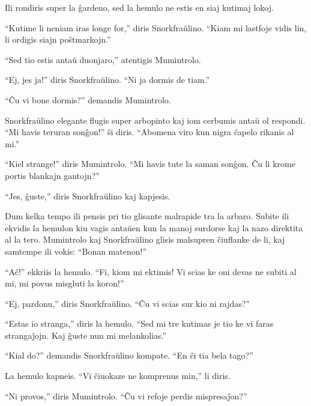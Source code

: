 Ili rondiris super la ĝardeno, sed la hemulo ne estis en siaj kutimaj lokoj.

``Kutime li neniam iras longe for,'' diris Snorkfraŭlino. ``Kiam mi lastfoje vidis lin, li ordigis siajn poŝtmarkojn.''

``Sed tio estis antaŭ duonjaro,'' atentigis Mumintrolo.

``Ej, jes ja!'' diris Snorkfraŭlino. ``Ni ja dormis de tiam.''

``Ĉu vi bone dormis?'' demandis Mumintrolo.

Snorkfraŭlino elegante flugis super arbopinto kaj iom cerbumis antaŭ ol respondi. ``Mi havis teruran sonĝon!'' ŝi diris. ``Abomena viro kun nigra ĉapelo rikanis al mi.''

``Kiel strange!'' diris Mumintrolo. ``Mi havis tute la saman sonĝon. Ĉu li krome portis blankajn gantojn?''

``Jes, ĝuste,'' diris Snorkfraŭlino kaj kapjesis.

Dum kelka tempo ili pensis pri tio glisante malrapide tra la arbaro. Subite ili ekvidis la hemulon kiu vagis antaŭen kun la manoj surdorse kaj la nazo direktita al la tero. Mumintrolo kaj Snorkfraŭlino glisis malsupren ĉiuflanke de li, kaj samtempe ili vokis: ``Bonan matenon!''

``Aĉ!'' ekkriis la hemulo. ``Fi, kiom mi ektimis! Vi scias ke oni devas ne subiti al mi, mi povus misgluti la koron!''

``Ej, pardonu,'' diris Snorkfraŭlino. ``Ĉu vi scias sur kio ni rajdas?''

``Estas io stranga,'' diris la hemulo. ``Sed mi tre kutimas je tio ke vi faras strangaĵojn. Kaj ĝuste nun mi melankolias.''

``Kial do?'' demandis Snorkfraŭlino kompate. ``En ĉi tia bela tago?''

La hemulo kapneis. ``Vi ĉiuokaze ne komprenus min,'' li diris.

``Ni provos,'' diris Mumintrolo. ``Ĉu vi refoje perdis mispresaĵon?''

